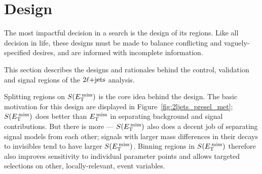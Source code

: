 \FloatBarrier
\section{Design}

The most impactful decision in a search is the design of its regions.
Like all decision in life, these designs must be made to balance conflicting
and vaguely-specified desires, and are informed with incomplete information.

This section describes the designs and rationales behind the control, validation
and signal regions of the $2\ell\mathrm{+jets}$ analysis.


Splitting regions on $S(E_\mathrm{T}^\mathrm{\:miss})$ is the core idea behind the design.
The basic motivation for this design are displayed in
Figure~\ref{fig:2ljets_presel_met};
$S(E_\mathrm{T}^\mathrm{\:miss})$ does better than $E_\mathrm{T}^\mathrm{\:miss}$ in separating background and signal
contributions.
But there is more --- $S(E_\mathrm{T}^\mathrm{\:miss})$ also does a decent job of separating signal
models from each other;
signals with larger mass differences in their decays to invisibles tend to have
larger $S(E_\mathrm{T}^\mathrm{\:miss})$.
Binning regions in $S(E_\mathrm{T}^\mathrm{\:miss})$ therefore also improves sensitivity to
individual parameter points and allows targeted selections on other, locally-relevant,
event variables.

